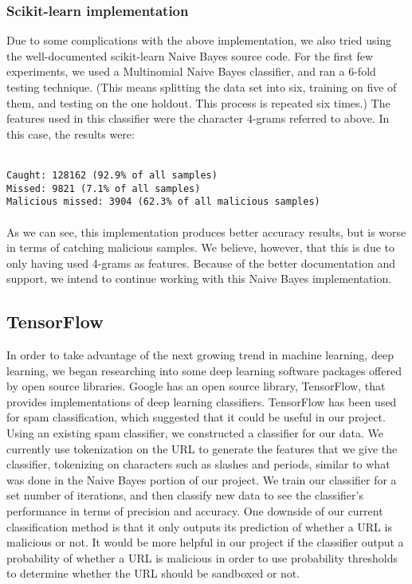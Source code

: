 \documentclass[cs,midyearupdate]{hmcclinic}
\begin{document}
\subsubsection{Scikit-learn implementation}

Due to some complications with the above implementation, we also tried using the well-documented scikit-learn Naive Bayes source code. For the first few experiments, we used a Multinomial Naive Bayes classifier, and ran a 6-fold testing technique. (This means splitting the data set into six, training on five of them, and testing on the one holdout. This process is repeated six times.) The features used in this classifier were the character 4-grams referred to above. In this case, the results were:

\texttt{\\
Caught: 128162 (92.9\% of all samples) \\
Missed: 9821 (7.1\% of all samples) \\
Malicious missed: 3904 (62.3\% of all malicious samples)}
\\\\
As we can see, this implementation produces better accuracy results, but is worse in terms of catching malicious samples. We believe, however, that this is due to only having used 4-grams as features. Because of the better documentation and support, we intend to continue working with this Naive Bayes implementation.

\subsection{TensorFlow}

In order to take advantage of the next growing trend in machine learning, deep learning, we began researching into some deep learning software packages offered by open source libraries. Google has an open source library, TensorFlow, that provides implementations of deep learning classifiers. TensorFlow has been used for spam classification, which suggested that it could be useful in our project. Using an existing spam classifier, we constructed a classifier for our data. We currently use tokenization on the URL to generate the features that we give the classifier, tokenizing on characters such as slashes and periods, similar to what was done in the Naive Bayes portion of our project. We train our classifier for a set number of iterations, and then classify new data to see the classifier's performance in terms of precision and accuracy. One downside of our current classification method is that it only outputs its prediction of whether a URL is malicious or not. It would be more helpful in our project if the classifier output a probability of whether a URL is malicious in order to use probability thresholds to determine whether the URL should be sandboxed or not.
\end{document}
